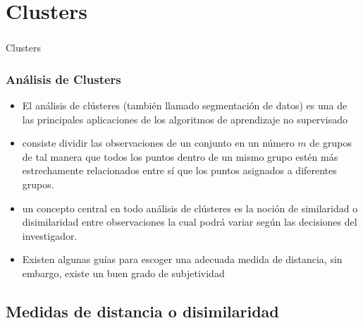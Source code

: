 \documentclass[
  shownotes,
  xcolor={svgnames},
  hyperref={colorlinks,citecolor=DarkBlue,linkcolor=DarkRed,urlcolor=DarkBlue}
  , aspectratio=169]{beamer}
\begin{document}
\section{Clusters}
\begin{frame}[fragile]
\frametitle{}


\centering
{\huge \textcolor{andesred}{Clusters}}



\end{frame}
\begin{frame}
\frametitle{Análisis de Clusters}


\begin{itemize}

  \item El análisis de clústeres (también llamado segmentación de datos) es una de las principales aplicaciones de los algoritmos de aprendizaje no
  supervisado 
  \medskip
  \item consiste dividir las observaciones de un conjunto en un número \(m\) de grupos de tal manera que todos los puntos dentro de un mismo grupo estén más estrechamente relacionados entre sí que los puntos asignados a diferentes grupos.
  \medskip
  \item un concepto central en todo análisis de clústeres es la noción de similaridad o disimilaridad entre observaciones la cual podrá variar
  según las decisiones del investigador. 
  \medskip
  \item Existen algunas guías para escoger una adecuada medida de distancia, sin embargo, existe un buen grado de subjetividad 
\end{itemize}

\end{frame}
\subsection{Medidas de distancia o disimilaridad}
\end{document}
